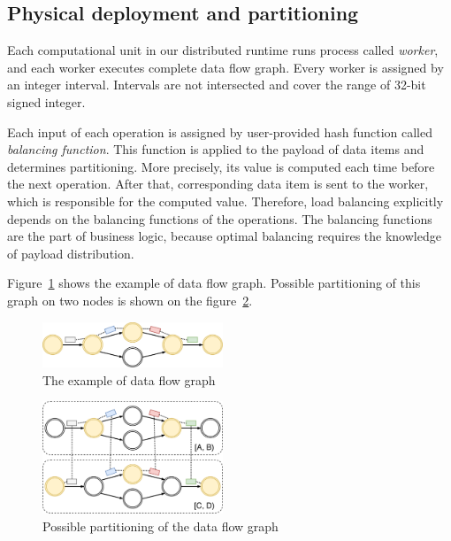 \subsection{Physical deployment and partitioning}

Each computational unit in our distributed runtime runs process called {\it worker}, and each worker executes complete data flow graph. Every worker is assigned by an integer interval. Intervals are not intersected and cover the range of 32-bit signed integer.

Each input of each operation is assigned by user-provided hash function called {\it balancing function}. This function is applied to the payload of data items and determines partitioning. More precisely, its value is computed each time before the next operation. After that, corresponding data item is sent to the worker, which is responsible for the computed value. Therefore, load balancing explicitly depends on the balancing functions of the operations. The balancing functions are the part of business logic, because optimal balancing requires the knowledge of payload distribution.

Figure~\ref{logical-graph-figure} shows the example of data flow graph. Possible partitioning of this graph on two nodes is shown on the figure~\ref{physical-graph-figure}.

\begin{figure}[htbp]
  \centering
  \includegraphics[width=0.48\textwidth]{pics/logical-graph}
  \caption{The example of data flow graph}
  \label {logical-graph-figure}
\end{figure}

\begin{figure}[htbp]
  \centering
  \includegraphics[width=0.48\textwidth]{pics/physical-graph}
  \caption{Possible partitioning of the data flow graph}
  \label {physical-graph-figure}
\end{figure}

